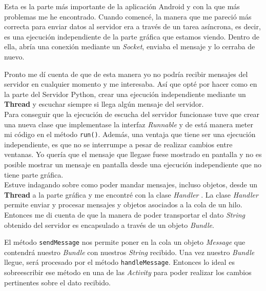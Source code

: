 Esta es la parte más importante de la aplicación Android y con la que más problemas me he encontrado.
Cuando comencé, la manera que me pareció más correcta para enviar datos al servidor era a través de un tarea asíncrona, es decir, es una ejecución independiente de la parte gráfica que estamos viendo. Dentro de ella, abría una conexión mediante un \textit{Socket}, enviaba el mensaje y lo cerraba de nuevo. 

Pronto me dí cuenta de que de esta manera yo no podría recibir mensajes del servidor en cualquier momento y me interesaba. Así que opté por hacer como en la parte del Servidor Python, crear una ejecución independiente mediante un \textbf{Thread} y escuchar siempre si llega algún mensaje del servidor.\\
Para conseguir que la ejecución de escucha del servidor funcionase tuve que crear una nueva clase que implementase la interfaz \textit{Runnable} y de está manera meter mi código en el método \verb|run()|. Además, una ventaja que tiene ser una ejecución independiente, es que no se interrumpe a pesar de realizar cambios entre ventanas. Yo quería que el mensaje que llegase fuese mostrado en pantalla y no es posible mostrar un mensaje en pantalla desde una ejecución independiente que no tiene parte gráfica.\\
Estuve indagando sobre como poder mandar mensajes, incluso objetos, desde un \textbf{Thread} a la parte gráfica y me encontré con la clase \textit{Handler} \cite{android:Handler}. La clase \textit{Handler} permite enviar y procesar mensajes y objetos asociados a la cola de un hilo. Entonces me di cuenta de que la manera de poder transportar el dato \textit{String} obtenido del servidor es encapsulado a través de un objeto \textit{Bundle}.

El método \verb|sendMessage| nos permite poner en la cola un objeto \textit{Message} que contendrá nuestro \textit{Bundle} con nuestros \textit{String} recibido. Una vez nuestro \textit{Bundle} llegue, será procesado por el método \verb|handleMessage|. Entonces lo ideal es sobreescribir ese método en una de las \textit{Activity} para poder realizar los cambios pertinentes sobre el dato recibido.

